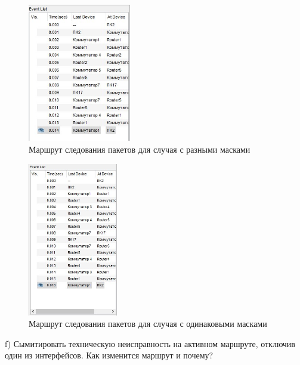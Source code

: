 \documentclass[bachelor, och, labwork]{shiza}
\begin{document}
\begin{enumerate}
    \begin{figure}[H]
        \centering      %
        \includegraphics[width=0.4\textwidth]{9}
        \caption{Маршрут следования пакетов для случая с разными масками}
        \label{fig:image1}
    \end{figure}

    \begin{figure}[H]
        \centering      %
        \includegraphics[width=0.35\textwidth]{10}
        \caption{Маршрут следования пакетов для случая с одинаковыми масками}
        \label{fig:image1}
    \end{figure}

    f) Сымитировать техническую неисправность на активном маршруте, отключив один из интерфейсов. Как изменится маршрут и почему?


\end{enumerate}
\end{document}
